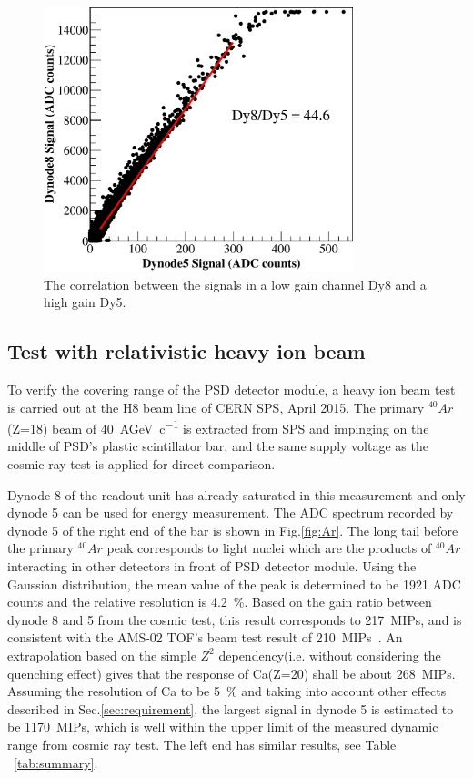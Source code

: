 \documentclass[5p, times]{elsarticle}
\begin{document}
\begin{figure}
	\centering
	\includegraphics[width=90mm]{dy58}
	\caption{The correlation between the signals in a low gain channel Dy8 and a high gain Dy5.}
	\label{fig:dy58}
\end{figure} 

\subsection{Test with relativistic heavy ion beam}
\label{sec:beam}
To verify the covering range of the PSD detector module, a heavy ion beam test is carried out at the H8 beam line of CERN SPS, April 2015.
The primary $^{40}{Ar}$(Z=18) beam of \SI{40}{AGeV\per c} is extracted from SPS and impinging on the middle of PSD's plastic scintillator bar, and the same supply voltage as the cosmic ray test is applied for direct comparison.
  
Dynode 8 of the readout unit has already saturated in this measurement and only dynode 5 can be used for energy measurement.
The ADC spectrum recorded by dynode 5 of the right end of the bar is shown in Fig.\ref{fig:Ar}. 
The long tail before the primary $^{40}Ar$ peak corresponds to light nuclei which are the products of $^{40}Ar$ interacting in other detectors in front of PSD detector module.
Using the Gaussian distribution, the mean value of the peak is determined to be 1921 ADC counts and the relative resolution is \SI{4.2}{\percent}.
Based on the gain ratio between dynode 8 and 5 from the cosmic test, this result corresponds to \SI{217}{MIPs}, and is consistent with the AMS-02 TOF's beam test result of \SI{210}{MIPs}~\cite{bindi2005performance}.
An extrapolation based on the simple $Z^2$ dependency(i.e. without considering the quenching effect) gives that the response of Ca(Z=20) shall be about \SI{268}{MIPs}.
Assuming the resolution of Ca to be \SI{5}{\percent} and taking into account other effects described in Sec.\ref{sec:requirement}, the largest signal in dynode 5 is estimated to be \SI{1170}{MIPs}, which is well within the upper limit of the measured dynamic range from cosmic ray test.
The left end has similar results, see Table ~\ref{tab:summary}.
\end{document}
